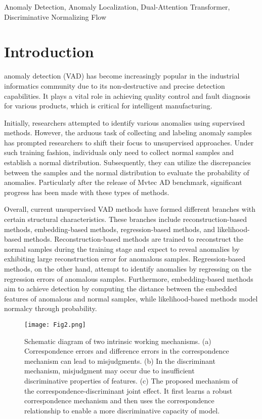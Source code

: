 \documentclass[journal]{IEEEtran}
\begin{document}
\begin{IEEEkeywords}
Anomaly Detection, Anomaly Localization, Dual-Attention Transformer, Discriminative Normalizing Flow
\end{IEEEkeywords}

\section{Introduction}
\label{sec:introduction}

 anomaly detection (VAD) has become increasingly popular in the industrial informatics community due to its non-destructive and precise detection capabilities. It plays a vital role in achieving quality control and fault diagnosis for various products\cite{r1}, which is critical for intelligent manufacturing.

Initially, researchers attempted to identify various anomalies using supervised methods\cite{r2}. However, the arduous task of collecting and labeling anomaly samples has prompted researchers to shift their focus to unsupervised approaches. Under such training fashion, individuals only need to collect normal samples and establish a normal distribution. Subsequently, they can utilize the discrepancies between the samples and the normal distribution to evaluate the probability of anomalies. Particularly after the release of Mvtec AD benchmark\cite{r3}, significant progress has been made with these types of methods.


Overall, current unsupervised VAD methods have formed different branches with certain structural characteristics. These branches include reconstruction-based methods\cite{r4}, embedding-based methods\cite{r5}, regression-based methods\cite{r6}, and likelihood-based methods\cite{r7}. Reconstruction-based methods are trained to reconstruct the normal samples during the training stage and expect to reveal anomalies by exhibiting large reconstruction error for anomalous samples. Regression-based methods, on the other hand, attempt to identify anomalies by regressing on the regression errors of anomalous samples. Furthermore, embedding-based methods aim to achieve detection by computing the distance between the embedded features of anomalous and normal samples, while likelihood-based methods model normalcy through probability.


\begin{figure}[t]\centering
\texttt{[image: Fig2.png]}
\caption{Schematic diagram of two intrinsic working mechanisms. (a) Correspondence errors and difference errors in the correspondence mechanism can lead to misjudgments. (b) In the discriminant mechanism, misjudgment may occur due to insufficient discriminative properties of features. (c) The proposed mechanism of the correspondence-discriminant joint effect. It first learns a robust correspondence mechanism and then uses the correspondence relationship to enable a more discriminative capacity of model.}
\label{FIG1}
\end{figure}
\end{document}
